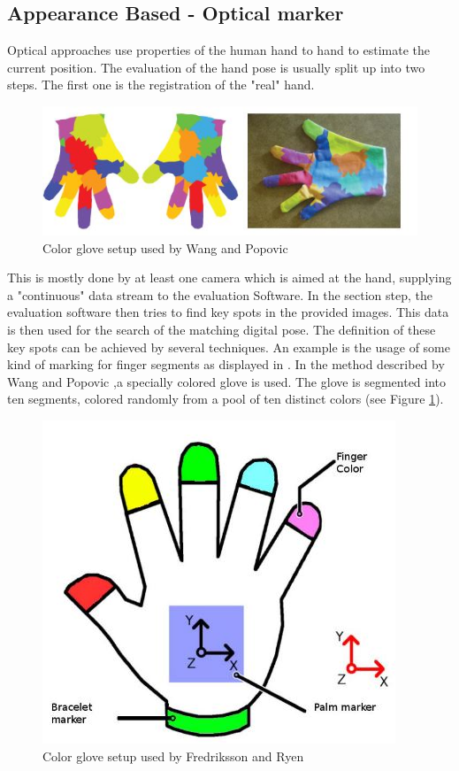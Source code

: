 \subsection{Appearance Based - Optical marker}
\label{Appearance Based Optical marker}
Optical approaches use properties of the human hand to hand to estimate the current position. The evaluation of the hand pose is usually split up into two steps. The first one is the registration of the "real" hand.
\begin{figure}
\includegraphics[scale=0.61]{images/wang_color_glove.JPG}
\caption{Color glove setup used by Wang and Popovic \cite{Wang.2009} }
\label{wang color glove}
\end{figure}
This is mostly done by at least one camera which is aimed at the hand, supplying a "continuous" data stream to the evaluation Software. In the section step, the evaluation software then tries to find key spots in the provided images. This data is then used for the search of the matching digital pose. The definition of these key spots can be achieved by several techniques.
An example is the usage of some kind of marking for finger segments as displayed in \cite{Duca.2007,Fredriksson.2008,Wang.2009}.
In the method described by Wang and Popovic \cite{Wang.2009},a specially colored glove is used. The glove is segmented into ten segments, colored randomly from a pool of ten distinct colors (see Figure \ref{wang color glove}).
\newpage
\begin{figure}
\includegraphics[scale=0.61]{images/fredrikkson_color_glove.JPG}
\caption{Color glove setup used by Fredriksson and Ryen \cite{Fredriksson.2008} }
\label{Fredriksson color glove}
\end{figure}

